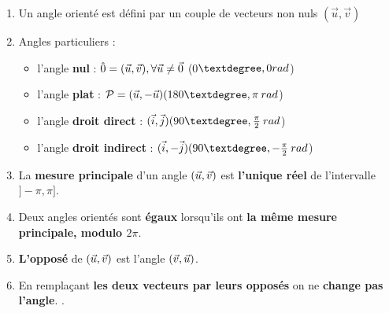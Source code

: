 \begin{enumerate}
\item Un angle orienté est défini par un couple de vecteurs non nuls $(\vec{u}, \vec{v})$

\item Angles particuliers :
\begin{itemize}
	\item l'angle \textbf{nul} : $\hat{0} = (\vec{u}, \vec{v}) , \forall \vec{u} \neq \vec{0} $  (0$\textdegree, 0 rad$)
	\item l'angle \textbf{plat} :  $\mathcal{P} = \aopn{u}{u} (180\textdegree, \pi \:rad $)
	\item l'angle \textbf{droit direct} : $\aopp{i}{j} (90\textdegree, \frac{\pi}{2} \: rad$)
	\item l'angle \textbf{droit indirect} : $\aopn{i}{j} (90\textdegree, -\frac{\pi}{2} \: rad$)
\end{itemize}

\item La \textbf{mesure principale} d'un angle $(\vec{u}, \vec{v})$ est \textbf{l'unique réel} de l'intervalle $]-\pi, \pi]$.

\item Deux angles orientés sont \textbf{égaux} lorsqu'ils ont \textbf{la même mesure principale, modulo $2\pi$}.

\item \textbf{L'opposé} de $(\vec{u}, \vec{v})$ est l'angle $(\vec{v}, \vec{u})$. %

\item En remplaçant \textbf{les deux vecteurs par leurs opposés} on ne \textbf{change pas l'angle}. %
.
\end{enumerate}
